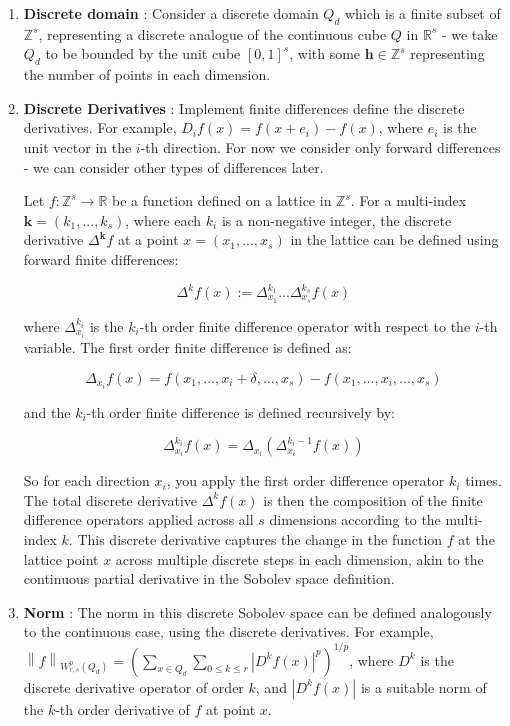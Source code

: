 \documentclass{article}
\begin{document}
\begin{enumerate}
    \item \textbf{Discrete domain} : Consider a discrete domain \( Q_d \) which is a finite subset of \( \mathbb{Z}^s \), representing a discrete analogue of the continuous cube \( Q \) in \( \mathbb{R}^s \) - we take \(Q_{d}\) to be bounded by the unit cube \( [0,1]^s \), with some \( \mathbf{h} \in \mathbb{Z}^{s}  \) representing the number of points in each dimension.
    \item \textbf{Discrete Derivatives} : Implement finite differences define the discrete derivatives. For example, \( D_i f(x) = f(x + e_i) - f(x) \), where \( e_i \) is the unit vector in the \( i \)-th direction. For now we consider only forward differences - we can consider other types of differences later.

    Let \( f: \mathbb{Z}^s \rightarrow \mathbb{R} \) be a function defined on a lattice in \( \mathbb{Z}^s \). For a multi-index \( \mathbf{k} = (k_1, ..., k_s) \), where each \( k_i \) is a non-negative integer, the discrete derivative \( \Delta^{\mathbf{k}} f \) at a point \( x = (x_1, ..., x_s) \) in the lattice can be defined using forward finite differences:

    \[ \Delta^k f(x) := \Delta^{k_1}_{x_1} ... \Delta^{k_s}_{x_s} f(x) \]

    where \( \Delta^{k_i}_{x_i} \) is the \( k_i \)-th order finite difference operator with respect to the \( i \)-th variable. The first order finite difference is defined as:

    \[ \Delta_{x_i} f(x) = f(x_1, ..., x_i + \delta, ..., x_s) - f(x_1, ..., x_i, ..., x_s) \]

    and the \( k_i \)-th order finite difference is defined recursively by:

    \[ \Delta^{k_i}_{x_i} f(x) = \Delta_{x_i} (\Delta^{k_i-1}_{x_i} f(x)) \]

    So for each direction \( x_i \), you apply the first order difference operator \( k_i \) times. The total discrete derivative \( \Delta^k f(x) \) is then the composition of the finite difference operators applied across all \( s \) dimensions according to the multi-index \( k \). This discrete derivative captures the change in the function \( f \) at the lattice point \( x \) across multiple discrete steps in each dimension, akin to the continuous partial derivative in the Sobolev space definition. 

    \item \textbf{Norm} : The norm in this discrete Sobolev space can be defined analogously to the continuous case, using the discrete derivatives. For example, \( \left\| f \right\|_{W_{r,s}^{p}(Q_d)} = \left( \sum_{x \in Q_d} \sum_{0 \leq k \leq r} |D^k f(x)|^p \right)^{1/p} \), where \( D^k \) is the discrete derivative operator of order \( k \), and \( |D^k f(x)| \) is a suitable norm of the \( k \)-th order derivative of \( f \) at point \( x \).
\end{enumerate}
\end{document}
